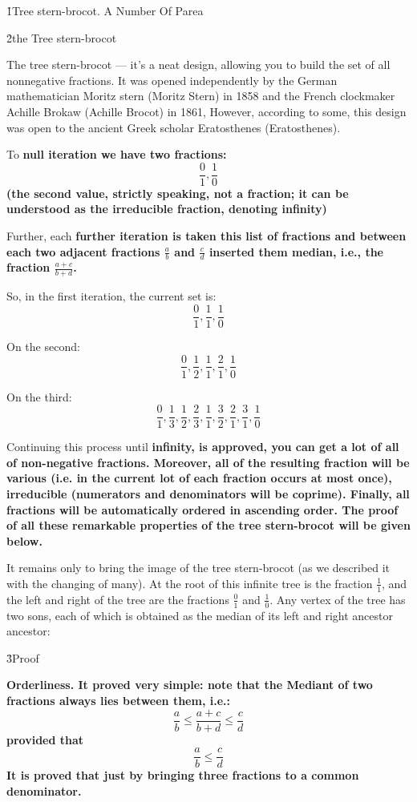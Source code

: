 \h1{Tree stern-brocot. A Number Of Parea}

\h2{the Tree stern-brocot}

The tree stern-brocot --- it's a neat design, allowing you to build the set of all nonnegative fractions. It was opened independently by the German mathematician Moritz stern (Moritz Stern) in 1858 and the French clockmaker Achille Brokaw (Achille Brocot) in 1861, However, according to some, this design was open to the ancient Greek scholar Eratosthenes (Eratosthenes).

To \bf{null} iteration we have two fractions:
$$ \frac{0}{1}, \frac{1}{0} $$
(the second value, strictly speaking, not a fraction; it can be understood as the irreducible fraction, denoting infinity)

Further, each \bf{further} iteration is taken this list of fractions and between each two adjacent fractions $\frac{a}{b}$ and $\frac{c}{d}$ inserted them \bf{median}, i.e., the fraction $\frac{a+c}{b+d}$.

So, in the first iteration, the current set is:
$$ \frac{0}{1}, \frac{1}{1}, \frac{1}{0} $$

On the second:
$$ \frac{0}{1}, \frac{1}{2}, \frac{1}{1}, \frac{2}{1}, \frac{1}{0} $$

On the third:
$$ \frac{0}{1}, \frac{1}{3}, \frac{1}{2}, \frac{2}{3}, \frac{1}{1}, \frac{3}{2}, \frac{2}{1}, \frac{3}{1}, \frac{1}{0} $$

Continuing this process until \bf{infinity}, is approved, you can get a lot of \bf{all} of non-negative fractions. Moreover, all of the resulting fraction will be \bf{various} (i.e. in the current lot of each fraction occurs at most once), \bf{irreducible} (numerators and denominators will be coprime). Finally, all fractions will be automatically \bf{ordered} in ascending order. The proof of all these remarkable properties of the tree stern-brocot will be given below.

It remains only to bring the image of the tree stern-brocot (as we described it with the changing of many). At the root of this infinite tree is the fraction $\frac{1}{1}$, and the left and right of the tree are the fractions $\frac{0}{1}$ and $\frac{1}{0}$. Any vertex of the tree has two sons, each of which is obtained as the median of its left and right ancestor ancestor:


\h3{Proof}

\bf{Orderliness}. It proved very simple: note that the Mediant of two fractions always lies between them, i.e.:
$$ \frac{a}{b} \le \frac{a+c}{b+d} \le \frac{c}{d} $$
provided that
$$ \frac{a}{b} \le \frac{c}{d} $$
It is proved that just by bringing three fractions to a common denominator.

